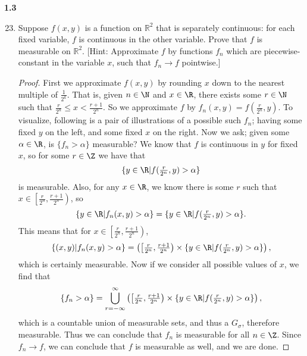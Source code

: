\documentclass[letterpaper]{article}
\begin{document}
\pagebreak
\textbf{1.3}

\begin{enumerate}

  \setcounter{enumi}{22}
  \item Suppose $f(x,y)$ is a function on $\mathbb{R}^2$ that is separately continuous: for each fixed variable, $f$ is continuous in the other variable. Prove that $f$ is measurable on $\mathbb{R}^2$. [Hint: Approximate $f$ by functions $f_n$ which are piecewise-constant in the variable $x$, such that $f_n \rightarrow f$ pointwise.]
  \begin{proof}
    First we approximate $f(x,y)$ by rounding $x$ down to the nearest multiple of $\frac{1}{2^k}$. That is, given $n\in\N$ and $x\in\R$, there exists some $r\in\N$ such that $\frac{r}{2^n} \leq x < \frac{r+1}{2^n}$. So we approximate $f$ by $f_n(x,y)=f(\frac{r}{2^n}, y)$. To visualize, following is a pair of illustrations of a possible such $f_n$; having some fixed $y$ on the left, and some fixed $x$ on the right.
    Now we ask; given some $\alpha\in\R$, is $\{f_n > \alpha\}$ measurable? We know that $f$ is continuous in $y$ for fixed $x$, so for some $r\in\Z$ we have that
    $$\{y\in\R | f(\tfrac{r}{2^n}, y) > \alpha\}$$
    is measurable. Also, for any $x \in \R$, we know there is some $r$ such that $x \in \left[\frac{r}{2^n}, \frac{r+1}{2^n}\right)$, so
    $$\{y\in\R | f_n(x, y) > \alpha\} = \{y\in\R | f(\tfrac{r}{2^n}, y) > \alpha\}.$$
    This means that for $x \in \left[\frac{r}{2^n}, \frac{r+1}{2^n}\right)$,
    $$\{(x,y) | f_n(x,y) > \alpha\} = \left(\left[\tfrac{r}{2^n}, \tfrac{r+1}{2^n}\right) \times \{y\in\R | f(\tfrac{r}{2^n}, y) > \alpha\}\right),$$
    which is certainly measurable. Now if we consider all possible values of $x$, we find that
    $$\{f_n > \alpha\} = \bigcup_{r=-\infty}^\infty\left(\left[\tfrac{r}{2^n}, \tfrac{r+1}{2^n}\right) \times \{y\in\R | f(\tfrac{r}{2^n}, y) > \alpha\}\right),$$
    which is a countable union of measurable sets, and thus a $G_\sigma$, therefore measurable. Thus we can conclude that $f_n$ is measurable for all $n\in\Z$. Since $f_n\to f$, we can conclude that $f$ is measurable as well, and we are done.
  \end{proof}
\pagebreak


\end{enumerate}
\end{document}
